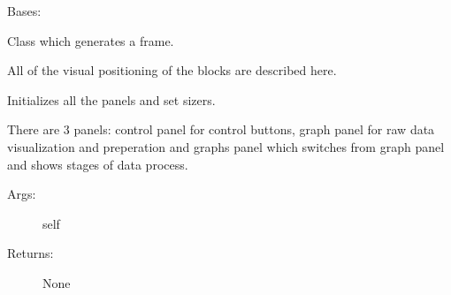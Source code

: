 \documentclass[letterpaper,10pt,english]{sphinxmanual}
\begin{document}
\begin{fulllineitems}
\label{\detokenize{GUI:GUI.MyFrame}}
Bases: 

Class which generates a frame.

All of the visual positioning of the blocks are described here.

\begin{fulllineitems}
\label{\detokenize{GUI:GUI.MyFrame.init_frame}}
Initializes all the panels and set sizers.

There are 3 panels: control panel for control buttons, graph panel
for raw data visualization and preperation and graphs panel which
switches from graph panel and shows stages of data process.
\begin{description}
\item[{Args:}] \leavevmode
self

\item[{Returns:}] \leavevmode
None

\end{description}

\end{fulllineitems}


\end{fulllineitems}

\end{document}
